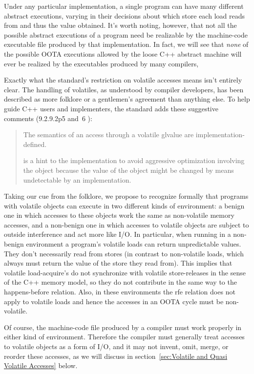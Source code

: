 \documentclass[10]{article}
\begin{document}
Under any particular implementation,
a single program can have many different abstract executions,
varying in their decisions about which store each load reads from
and thus the value obtained.
It's worth noting, however, that not all the possible abstract executions
of a program need be realizable by the machine-code executable file
produced by that implementation.
In fact, we will see that \emph{none} of the possible OOTA executions
allowed by the loose C++ abstract machine will ever be realized
by the executables produced by many compilers,

Exactly what the standard's restriction on volatile accesses means
isn't entirely clear.
The handling of volatiles, as understood by compiler developers, has
been described as more folklore or a gentlemen's agreement than
anything else.
To help guide C++ users and implementers, the standard adds these
suggestive comments (9.2.9.2p5 and~6 ):
\begin{quote}
	The semantics of an access through a volatile glvalue are
	implementation-defined.

	 is a hint to the implementation to avoid aggressive
	optimization involving the object because the value of the object
	might be changed by means undetectable by an implementation.
\end{quote}

Taking our cue from the folklore, we propose to recognize formally
that programs with volatile objects can execute in two different kinds
of environment: a benign one in which accesses to these objects work
the same as non-volatile memory accesses, and a non-benign one in which
accesses to volatile objects are subject to outside interference and
act more like I/O.
In particular, when running in a non-benign environment a program's
volatile loads can return unpredictable values.
They don't necessarily read from stores (in contrast to non-volatile loads,
which always must return the value of the store they read from).
This implies that volatile load-acquire's do not synchronize with
volatile store-releases in the sense of the C++ memory model,
so they do not contribute in the same way to the happens-before relation.
Also, in these environments the rfe relation does not apply
to volatile loads and hence the accesses in an OOTA cycle must be
non-volatile.

Of course, the machine-code file produced by a compiler must work
properly in either kind of environment.
Therefore the compiler must generally treat accesses to volatile objects
as a form of I/O, and it may not
invent, omit, merge, or reorder these accesses, as we will discuss in
section~\ref{sec:Volatile and Quasi Volatile Accesses} below.
\end{document}
